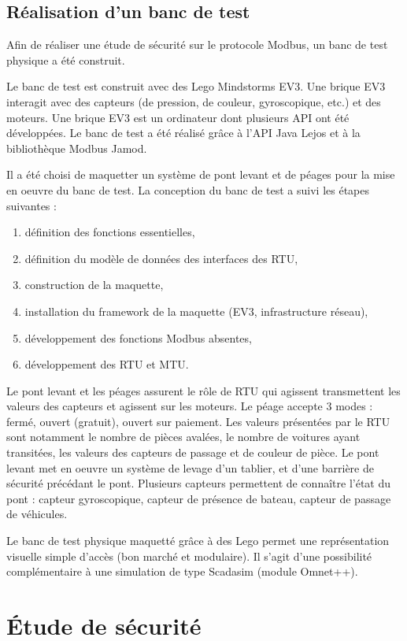 \documentclass[10pt,a4paper]{article}
\begin{document}
	\subsection{Réalisation d'un banc de test}
		Afin de réaliser une étude de sécurité sur le protocole Modbus, un banc de test physique a été construit.
	
		Le banc de test est construit avec des Lego Mindstorms EV3. Une brique EV3 interagit avec des capteurs (de pression, de couleur, gyroscopique, etc.) et des moteurs. Une brique EV3 est un ordinateur dont plusieurs API ont été développées. Le banc de test a été réalisé grâce à l'API Java Lejos et à la bibliothèque Modbus Jamod.
		
		Il a été choisi de maquetter un système de pont levant et de péages pour la mise en oeuvre du banc de test.
		La conception du banc de test a suivi les étapes suivantes :
		\begin{enumerate}
		\item définition des fonctions essentielles,
		\item définition du modèle de données des interfaces des RTU,
		\item construction de la maquette,
		\item installation du framework de la maquette (EV3, infrastructure réseau),
		\item développement des fonctions Modbus absentes,
		\item développement des RTU et MTU.
		\end{enumerate}
		
		Le pont levant et les péages assurent le rôle de RTU qui agissent transmettent les valeurs des capteurs et agissent sur les moteurs.
		Le péage accepte 3 modes : fermé, ouvert (gratuit), ouvert sur paiement. Les valeurs présentées par le RTU sont notamment le nombre de pièces avalées, le nombre de voitures ayant transitées, les valeurs des capteurs de passage et de couleur de pièce.
		Le pont levant met en oeuvre un système de levage d'un tablier, et d'une barrière de sécurité précédant le pont. Plusieurs capteurs permettent de connaître l'état du pont : capteur gyroscopique, capteur de présence de bateau, capteur de passage de véhicules.
		
		Le banc de test physique maquetté grâce à des Lego permet une représentation visuelle simple d'accès (bon marché et modulaire). Il s'agit d'une possibilité complémentaire à une simulation de type Scadasim (module Omnet++).

\section{Étude de sécurité}
\end{document}
